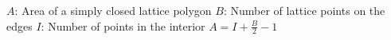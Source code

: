 $A$:
Area of a simply closed lattice polygon \newline
$B$:
Number of lattice points on the edges \newline
$I$:
Number of points in the interior \newline
$A = I + \frac{B} {2} - 1$
